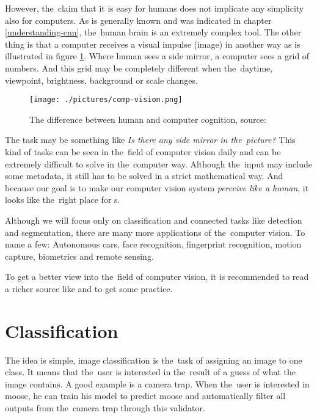 However, the~claim that it is easy for humans does not implicate any
simplicity also for computers. As is generally known and was indicated in 
chapter \ref{understanding-cnn}, the~human brain is an extremely complex tool. 
The other thing is that a computer receives a visual impulse (image) in another 
way as is illustrated in figure \ref{fig:mirror}. Where human sees a side 
mirror, a computer sees a grid of numbers. And this grid may be completely 
different when the~daytime, viewpoint, brightness, background or scale changes.

\begin{figure}[H]
   \centering
	\texttt{[image: ./pictures/comp-vision.png]}
	\caption[Human and computer cognition]{The difference between human and 
computer cognition, source: \cite{opencv}}
      \label{fig:mirror}
\end{figure}

The task may be something like \textit{Is there any side mirror in the~picture?} 
This kind of tasks can be seen in the~field of computer vision daily and can be 
extremely difficult to solve in the~computer way. Although the~input may include 
some metadata, it still has to be solved in a strict mathematical way. And 
because our goal is to make our computer vision system \textit{perceive like a 
human}, it looks like the~right place for s.

Although we will focus only on classification and connected tasks like detection 
and segmentation, there are many more applications of the~computer vision. To 
name a few: Autonomous cars, face recognition, fingerprint recognition, motion 
capture, biometrics and remote sensing.

To get a better view into the~field of computer vision, it is recommended to 
read a richer source like \cite{comp-vision} and \cite{opencv} to get some 
practice.

\section{Classification}
\label{classification}

The idea is simple, image classification is the~task of assigning an image to 
one class. It means that the~user is interested in the~result of a guess of what 
the image contains. A good example is a camera trap. When the~user is interested 
in moose, he can train his model to predict moose and automatically filter all 
outputs from the~camera trap through this validator.

